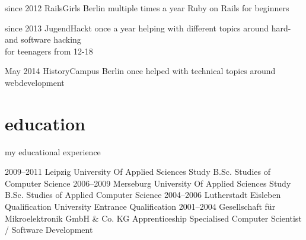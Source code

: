 \documentclass[]{friggeri-cv}
\begin{document}
\begin{entrylist}
  \entry
    {since 2012}
    {RailsGirls Berlin}
    {multiple times a year}
    {Ruby on Rails for beginners}

  \entry
    {since 2013}
    {JugendHackt}
    {once a year}
    {helping with different topics around hard- and software hacking\\for teenagers from 12-18}

  \entry
    {May 2014}
    {HistoryCampus Berlin}
    {once}
    {helped with technical topics around webdevelopment}

\end{entrylist}


\pagebreak
\section{education}
my educational experience

\begin{entrylist}
  \entry
    {2009–2011}
    {Leipzig University Of Applied Sciences}
    {Study B.Sc.}
    {Studies of Computer Science}
  \entry
    {2006–2009}
    {Merseburg University Of Applied Sciences}
    {Study B.Sc.}
    {Studies of Applied Computer Science}
  \entry
    {2004–2006}
    {Lutherstadt Eisleben}
    {Qualification}
    {University Entrance Qualification}
  \entry
    {2001–2004}
    {Gesellschaft für Mikroelektronik GmbH \& Co. KG}
    {Apprenticeship}
    {Specialised Computer Scientist / Software Development}
\end{entrylist}


%
\end{document}
